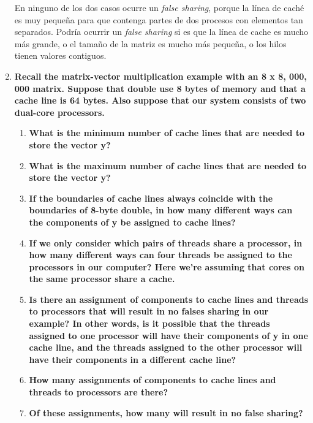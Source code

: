 \documentclass[a4paper,12pt]{article}
\begin{document}
\begin{enumerate}
En ninguno de los dos casos ocurre un \textit{false sharing}, porque la línea de caché es muy pequeña para que contenga partes
de dos procesos con elementos tan separados. Podría ocurrir un \textit{false sharing} si es que la línea de cache es mucho más grande,
o el tamaño de la matriz es mucho más pequeña, o los hilos tienen valores contiguos.

\item{ \textbf{Recall the matrix-vector multiplication example with an 8 x 8, 000, 000 matrix. Suppose that double use 8 bytes
of memory and that a cache line is 64 bytes. Also suppose that our system consists of two dual-core processors.}

\begin{enumerate}
 \item \textbf{What is the minimum number of cache lines that are needed to store the vector y?}
 \item \textbf{What is the maximum number of cache lines that are needed to store the vector y?}
 \item \textbf{If the boundaries of cache lines always coincide with the boundaries of 8-byte double, in how many different ways can
 the components of y be assigned to cache lines?}
 \item \textbf{If we only consider which pairs of threads share a processor, in how many different ways can four
 threads be assigned to the processors in our computer? Here we’re assuming that cores on the same processor share a
 cache.}
 \item \textbf{Is there an assignment of components to cache lines and threads to processors that will result in no
 falses sharing in our example? In other words, is it possible that the threads assigned to one processor will have their
 components of y in one cache line, and the threads assigned to the other processor will have their components in a different
 cache line?}
 \item \textbf{How many assignments of components to cache lines and threads to processors are there?}
 \item \textbf{Of these assignments, how many will result in no false sharing?}
\end{enumerate}
}


\end{enumerate}
\end{document}

